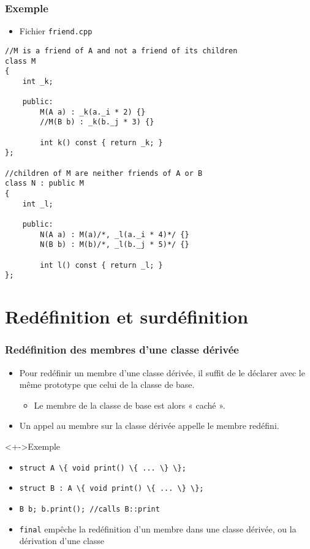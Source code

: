 \begin{frame}[containsverbatim]
\frametitle{Exemple}
\begin{itemize}
\item Fichier \texttt{friend.cpp}
\end{itemize}
\begin{lstlisting}
//M is a friend of A and not a friend of its children
class M
{
	int _k;

	public:
		M(A a) : _k(a._i * 2) {}
		//M(B b) : _k(b._j * 3) {}

		int k() const { return _k; }
};

//children of M are neither friends of A or B
class N : public M
{
	int _l;

	public:
		N(A a) : M(a)/*, _l(a._i * 4)*/ {}
		N(B b) : M(b)/*, _l(b._j * 5)*/ {}

		int l() const { return _l; }
};
\end{lstlisting}
\end{frame}

\section{Redéfinition et surdéfinition}

\begin{frame}
\frametitle{Redéfinition des membres d'une classe dérivée}
\begin{itemize}[<+->]
\item Pour redéfinir un membre d'une classe dérivée, il suffit de le déclarer avec le même prototype que celui de la classe de base.	
	\begin{itemize}
	\item Le membre de la classe de base est alors « caché ».
	\end{itemize}
\item Un appel au membre sur la classe dérivée appelle le membre redéfini.
\end{itemize}
\begin{exampleblock}<+->{Exemple}
	\begin{itemize}
	\item \lstinline|struct A \{ void print() \{ ... \} \};|
	\item \lstinline|struct B : A \{ void print() \{ ... \} \};|
	\item \lstinline|B b; b.print(); //calls B::print|
	\end{itemize}
\end{exampleblock}
\begin{itemize}[<+->]
\item \lstinline|final| empêche la redéfinition d'un membre dans une classe dérivée, ou la dérivation d'une classe
\end{itemize}
\end{frame}

